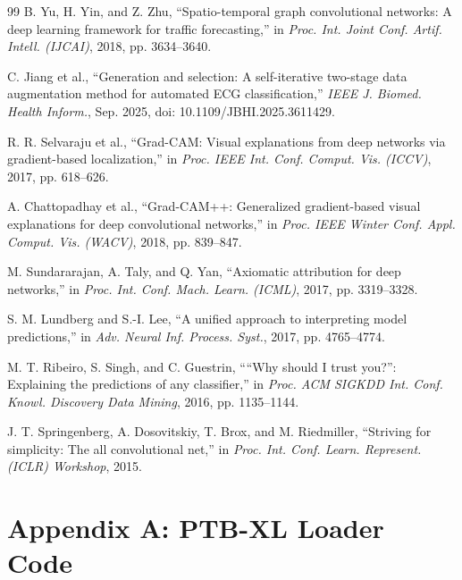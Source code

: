 \documentclass[12pt,a4paper]{report}
\begin{document}
\begin{thebibliography}{99}
B. Yu, H. Yin, and Z. Zhu, ``Spatio-temporal graph convolutional networks: A deep learning framework for traffic forecasting,'' in \textit{Proc. Int. Joint Conf. Artif. Intell. (IJCAI)}, 2018, pp. 3634--3640.

C. Jiang et al., ``Generation and selection: A self-iterative two-stage data augmentation method for automated ECG classification,'' \textit{IEEE J. Biomed. Health Inform.}, Sep. 2025, doi: 10.1109/JBHI.2025.3611429.

R. R. Selvaraju et al., ``Grad-CAM: Visual explanations from deep networks via gradient-based localization,'' in \textit{Proc. IEEE Int. Conf. Comput. Vis. (ICCV)}, 2017, pp. 618--626.

A. Chattopadhay et al., ``Grad-CAM++: Generalized gradient-based visual explanations for deep convolutional networks,'' in \textit{Proc. IEEE Winter Conf. Appl. Comput. Vis. (WACV)}, 2018, pp. 839--847.

M. Sundararajan, A. Taly, and Q. Yan, ``Axiomatic attribution for deep networks,'' in \textit{Proc. Int. Conf. Mach. Learn. (ICML)}, 2017, pp. 3319--3328.

S. M. Lundberg and S.-I. Lee, ``A unified approach to interpreting model predictions,'' in \textit{Adv. Neural Inf. Process. Syst.}, 2017, pp. 4765--4774.

M. T. Ribeiro, S. Singh, and C. Guestrin, ````Why should I trust you?'': Explaining the predictions of any classifier,'' in \textit{Proc. ACM SIGKDD Int. Conf. Knowl. Discovery Data Mining}, 2016, pp. 1135--1144.

J. T. Springenberg, A. Dosovitskiy, T. Brox, and M. Riedmiller, ``Striving for simplicity: The all convolutional net,'' in \textit{Proc. Int. Conf. Learn. Represent. (ICLR) Workshop}, 2015.

\end{thebibliography}

\clearpage

\chapter*{Appendix A: PTB-XL Loader Code}
\label{app:loader}
\end{document}
